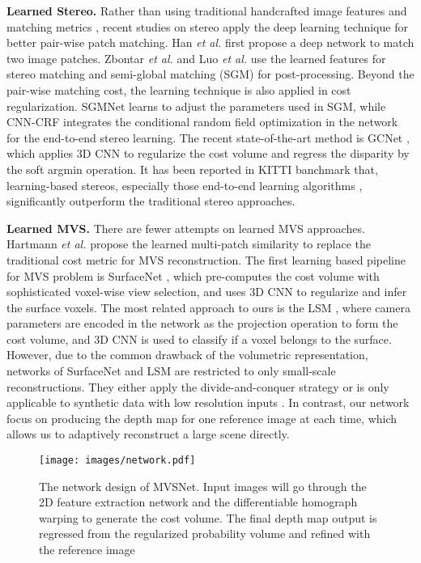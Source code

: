 \documentclass[runningheads]{llncs}
\def\etal{\emph{et al. }}
\begin{document}
\noindent \textbf{Learned Stereo. } 
Rather than using traditional handcrafted image features and matching metrics \cite{hirschmuller2007evaluation}, recent studies on stereo apply the deep learning technique for better pair-wise patch matching. Han \etal \cite{han2015matchnet} first propose a deep network to match two image patches. Zbontar \etal \cite{zbontar2016stereo} and Luo \etal \cite{luo2016efficient} use the learned features for stereo matching and semi-global matching (SGM) \cite{hirschmuller2008stereo} for post-processing. Beyond the pair-wise matching cost, the learning technique is also applied in cost regularization. SGMNet \cite{seki2017sgm} learns to adjust the parameters used in SGM, while CNN-CRF \cite{knobelreiter2017end} integrates the conditional random field optimization in the network for the end-to-end stereo learning. The recent state-of-the-art method is GCNet \cite{kendall2017end}, which applies 3D CNN to regularize the cost volume and regress the disparity by the soft argmin operation. It has been reported in KITTI banchmark \cite{menze2015object} that, learning-based stereos, especially those end-to-end learning algorithms \cite{mayer2016large,knobelreiter2017end,kendall2017end}, significantly outperform the traditional stereo approaches.

\noindent \textbf{Learned MVS. } There are fewer attempts on learned MVS approaches. Hartmann \etal propose the learned multi-patch similarity \cite{hartmann2017learned} to replace the traditional cost metric for MVS reconstruction. 
The first learning based pipeline for MVS problem is SurfaceNet \cite{ji2017surfacenet}, which pre-computes the cost volume with sophisticated voxel-wise view selection, and uses 3D CNN to regularize and infer the surface voxels. 
The most related approach to ours is the LSM \cite{kar2017learning}, where camera parameters are encoded in the network as the projection operation to form the cost volume, and 3D CNN is used to classify if a voxel belongs to the surface. 
However, due to the common drawback of the volumetric representation, networks of SurfaceNet and LSM are restricted to only small-scale reconstructions. 
They either apply the divide-and-conquer strategy \cite{ji2017surfacenet} or is only applicable to synthetic data with low resolution inputs \cite{kar2017learning}. In contrast, our network focus on producing the depth map for one reference image at each time, which allows us to adaptively reconstruct a large scene directly.


\begin{figure}[t!]
  \centering
  \texttt{[image: images/network.pdf]}
  \caption{The network design of MVSNet. Input images will go through the 2D feature extraction network and the differentiable homograph warping to generate the cost volume. The final depth map output is regressed from the regularized probability volume and refined with the reference image}
  \label{fig:network}
\end{figure}
\vspace{-3mm}
\end{document}
